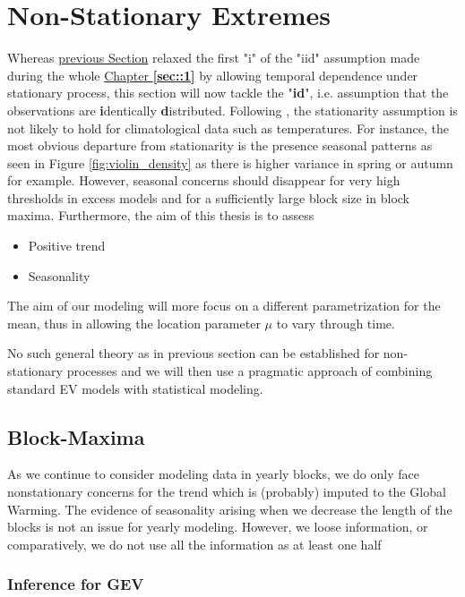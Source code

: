 \section{Non-Stationary Extremes}\label{nstatio}

Whereas \hyperref[sec:statio]{previous Section} relaxed the first "i" of the "iid" assumption made during the whole \hyperref[sec::1]{Chapter \textbf{\ref{sec::1}}} by allowing temporal dependence under stationary process, this section will now tackle the "\textbf{id}", i.e. assumption that the observations are \textbf{i}dentically \textbf{d}istributed. 
Following \cite{milly_climate_2008}, the stationarity assumption is not likely to hold for climatological data such as temperatures. For instance, the most obvious departure from stationarity is the presence seasonal patterns as seen in Figure \ref{fig:violin_density} as there is higher variance in spring or autumn for example. However, seasonal concerns should disappear for very high thresholds in excess models and for a sufficiently large block size in block maxima. Furthermore, the aim of this thesis is to assess 


\begin{itemize}
	\item Positive trend
	\item Seasonality
\end{itemize}

The aim of our modeling will more focus on a different parametrization for the mean, thus in allowing the location parameter $\mu$ to vary through time.

No such general theory as in previous section can be established for non-stationary processes and we will then use a pragmatic approach of combining standard EV models with statistical modeling.

\subsection{Block-Maxima}

As we continue to consider modeling data in yearly blocks, we do only face nonstationary concerns for the trend which is (probably) imputed to the Global Warming. 
The evidence of seasonality arising when we decrease the length of the blocks is not an issue for yearly modeling. However, we loose information, or comparatively, we do not use all the information as at least one half 


\subsubsection*{Inference for GEV}

